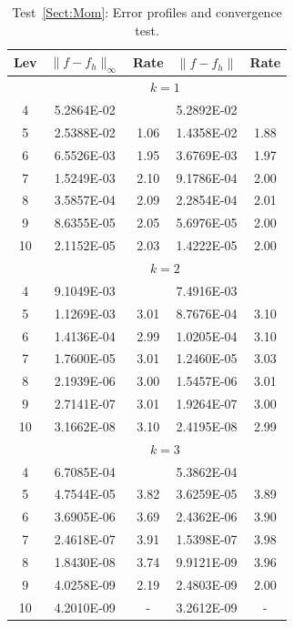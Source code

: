 \documentclass[preprint,11pt]{elsarticle}
\begin{document}
\begin{itemize}
\begin{table}[H]
\caption{Test~\ref{Sect:Mom}: Error profiles and convergence test.}\label{Tab:Mom-1}
\centering
\begin{tabular}{c|cc|cc}	\hline\hline
Lev & $\|f-f_h\|_{\infty}$ & Rate & $\|f-f_h\|$ & Rate \\ \hline		
&\multicolumn{4}{c}{$k=1$}\\ \hline
4	&5.2864E-02	&		&5.2892E-02	&\\
5	&2.5388E-02	&1.06	&1.4358E-02	&1.88\\
6	&6.5526E-03	&1.95	&3.6769E-03	&1.97\\
7	&1.5249E-03	&2.10	&9.1786E-04	&2.00\\
8	&3.5857E-04	&2.09	&2.2854E-04	&2.01\\
9	&8.6355E-05	&2.05	&5.6976E-05	&2.00\\
10	&2.1152E-05	&2.03	&1.4222E-05	&2.00\\ \hline
&\multicolumn{4}{c}{$k=2$}\\ \hline		
4	&9.1049E-03	&		&7.4916E-03	&\\
5	&1.1269E-03	&3.01	&8.7676E-04	&3.10\\
6	&1.4136E-04	&2.99	&1.0205E-04	&3.10\\
7	&1.7600E-05	&3.01	&1.2460E-05	&3.03\\
8	&2.1939E-06	&3.00	&1.5457E-06	&3.01\\
9	&2.7141E-07	&3.01	&1.9264E-07	&3.00\\
10	&3.1662E-08	&3.10	&2.4195E-08	&2.99\\ \hline
&\multicolumn{4}{c}{$k=3$}\\ \hline				
4	&6.7085E-04	&		&5.3862E-04	&\\
5	&4.7544E-05	&3.82	&3.6259E-05	&3.89\\
6	&3.6905E-06	&3.69	&2.4362E-06	&3.90\\
7	&2.4618E-07	&3.91	&1.5398E-07	&3.98\\
8	&1.8430E-08	&3.74	&9.9121E-09	&3.96\\
9	&4.0258E-09	&2.19	&2.4803E-09	&2.00\\
10	&4.2010E-09	&-       	&3.2612E-09	&- \\ \hline
\hline
\end{tabular}
\end{table}


\end{itemize}
\end{document}
